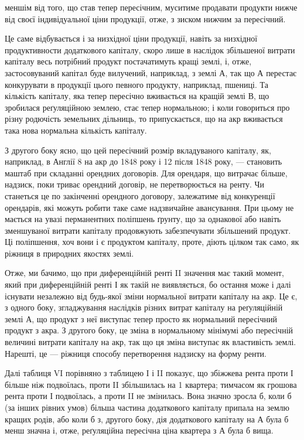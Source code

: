 \parcont{}  %
меншім від того, що став тепер пересічним, муситиме продавати продукти
нижче від своєї індивідуальної ціни продукції, отже, з зиском нижчим за
пересічний.

Це саме відбувається і за низхідної ціни продукції, навіть за низхідної продуктивности
додаткового капіталу, скоро лише в наслідок збільшеної витрати капіталу
весь потрібний продукт постачатимуть кращі землі, і, отже, застосовуваний капітал
буде вилучений, наприклад, з землі $А$, так що $А$ перестає конкурувати в продукції
цього певного продукту, наприклад, пшениці. Та кількість капіталу, яка
тепер пересічно вживається на кращій землі $В$, що зробилася реґуляційною
землею, стає тепер нормальною; і коли говориться про різну родючість земельних
дільниць, то припускається, що на акр вживається така нова нормальна
кількість капіталу.

З другого боку ясно, що цей пересічний розмір вкладуваного капіталу, як,
наприклад, в Англії 8 на акр до 1848 року і 12 після 1848 року, —
становить маштаб при складанні орендних договорів. Для орендаря, що витрачає
більше, надзиск, поки триває орендний договір, не перетворюється на ренту. Чи
станеться це по закінченні орендного договору, залежатиме від конкуренції орендарів,
які можуть робити таке саме надзвичайне авансування. При цьому не мається
на увазі перманентних поліпшень ґрунту, що за однакової або навіть зменшуваної
витрати капіталу продовжують забезпечувати збільшений продукт. Ці поліпшення,
хоч вони і є продуктом капіталу, проте, діють цілком так само, як
ріжниця в природних якостях землі.

Отже, ми бачимо, що при диференційній ренті II значення має такий момент,
який при диференційній ренті І як такій не виявляється, бо остання може
і далі існувати незалежно від будь-якої зміни нормальної витрати капіталу
на акр. Це є, з одного боку, згладжування наслідків різних витрат капіталу
на реґуляційній землі $А$, що продукт з неї виступає тепер просто як нормальний
пересічний продукт з акра. З другого боку, це зміна в нормальному мінімумі
або пересічній величині витрати капіталу на акр, так що ця зміна виступає як
властивість землі. Нарешті, це — ріжниця способу перетворення надзиску на форму
ренти.

Далі таблиця VI порівняно з таблицею І і II показує, що збіжжева рента
проти І більше ніж подвоїлась, проти II збільшилась на 1  квартера; тимчасом
як грошова рента проти І подвоїлась, а проти II не змінилась. Вона значно
зросла б, коли б (за інших рівних умов) більша частина додаткового капіталу
припала на землю кращих родів, або коли б з, другого боку, дія додаткового
капіталу на $А$ була б менш значна і, отже, реґуляційна пересічна ціна квартера
з $А$ була б вища.

